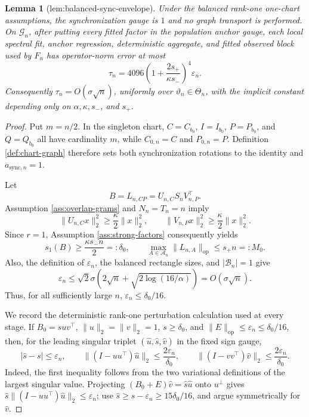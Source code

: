 \documentclass{article}
\newtheorem{lemma}{Lemma}
\begin{document}
\begin{lemma}[lem:balanced-sync-envelope]\label{lem:balanced-sync-envelope}
Under the balanced rank-one one-chart assumptions, the synchronization gauge is \(1\) and no graph transport is performed. On \(\mathcal G_n\), after putting every fitted factor in the population anchor gauge, each local spectral fit, anchor regression, deterministic aggregate, and fitted observed block used by \(F_n\) has operator-norm error at most
\[
\tau_n
=4096\left(1+\frac{2s_+}{\kappa s_-}\right)^4\varepsilon_n.
\]
Consequently \(\tau_n=O(\sigma\sqrt n)\), uniformly over \(\vartheta_n\in\Theta_n\), with the implicit constant depending only on \(\alpha,\kappa,s_-\), and \(s_+\).
\end{lemma}
\begin{proof}
Put \(m=n/2\).  In the singleton chart, \(C=C_{b_0}\), \(I=I_{b_0}\), \(P=P_{b_0}\), and \(Q=Q_{b_0}\) all have cardinality \(m\), while \(C_{0,n}=C\) and \(P_{0,n}=P\).  Definition \ref{def:chart-graph} therefore sets both synchronization rotations to the identity and \(a_{\mathrm{sync},n}=1\).

Let
\[
B=L_{n,CP}=U_{n,C}S_nV_{n,P}^{\top}.
\]
Assumption \ref{ass:overlap-grams} and \(N_n=T_n=n\) imply
\[
\lVert U_{n,C}x\rVert_2^2\ge\frac{\kappa}{2}\lVert x\rVert_2^2,
\qquad
\lVert V_{n,P}x\rVert_2^2\ge\frac{\kappa}{2}\lVert x\rVert_2^2.
\]
Since \(r=1\), Assumption \ref{ass:strong-factors} consequently yields
\[
s_1(B)\ge \frac{\kappa s_-n}{2}=: \delta_0,
\qquad
\max_{A\in\mathcal A_n}\lVert L_{n,A}\rVert_{\mathrm{op}}
\le s_+n=:M_0.
\]
Also, the definition of \(\varepsilon_n\), the balanced rectangle sizes, and \(|\mathcal B_n|=1\) give
\[
\varepsilon_n
\le\sqrt2\sigma\left(2\sqrt n+\sqrt{2\log(16/\alpha)}\right)
=O(\sigma\sqrt n).
\]
Thus, for all sufficiently large \(n\), \(\varepsilon_n\le\delta_0/16\).

We record the deterministic rank-one perturbation calculation used at every stage.  If \(B_0=suv^{\top}\), \(\lVert u\rVert_2=\lVert v\rVert_2=1\), \(s\ge\delta_0\), and \(\lVert E\rVert_{\mathrm{op}}\le\varepsilon_n\le\delta_0/16\), then, for the leading singular triplet \((\widehat u,\widehat s,\widehat v)\) in the fixed sign gauge,
\[
|\widehat s-s|\le\varepsilon_n,
\qquad
\lVert(I-uu^{\top})\widehat u\rVert_2
\le\frac{2\varepsilon_n}{\delta_0},
\qquad
\lVert(I-vv^{\top})\widehat v\rVert_2
\le\frac{2\varepsilon_n}{\delta_0}.
\]
Indeed, the first inequality follows from the two variational definitions of the largest singular value.  Projecting
\((B_0+E)\widehat v=\widehat s\widehat u\) onto \(u^{\perp}\) gives
\(\widehat s\lVert(I-uu^{\top})\widehat u\rVert_2\le\varepsilon_n\); use
\(\widehat s\ge s-\varepsilon_n\ge15\delta_0/16\), and argue symmetrically for \(\widehat v\).


\end{proof}
\end{document}
